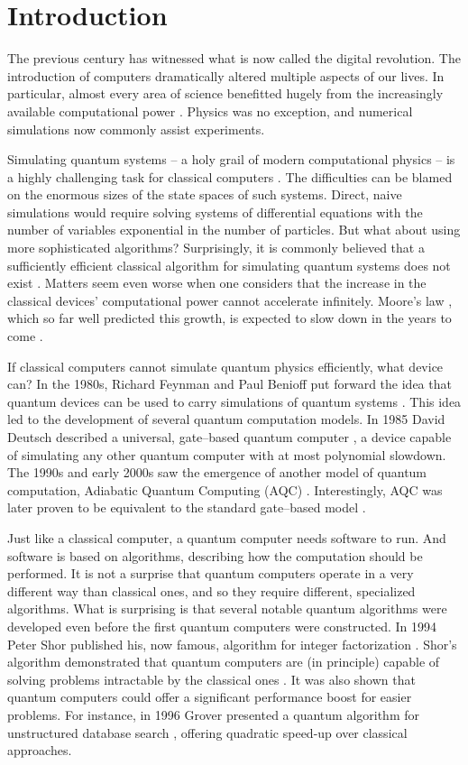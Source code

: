 \chapter*{Introduction}
The previous century has witnessed what is now called the digital revolution. The introduction of
computers dramatically altered multiple aspects of our lives. In particular, almost every area of
science benefitted hugely from the increasingly available computational power \cite{winsberg}.
Physics was no exception, and numerical simulations now commonly assist experiments.

Simulating quantum systems -- a holy grail of modern computational physics -- is a highly
challenging task for classical computers \cite{feynman.82}. The difficulties can be blamed on the
enormous sizes of the state spaces of such systems. Direct, naive simulations would require solving
systems of differential equations with the number of variables exponential in the number of
particles. But what about using more sophisticated algorithms? Surprisingly, it is commonly believed
that a sufficiently efficient classical algorithm for simulating quantum systems does not exist
\cite{feynman.82, poplavskii}. Matters seem even worse when one considers that the increase in the
classical devices' computational power cannot accelerate infinitely. Moore's law \cite{mack}, which
so far well predicted this growth, is expected to slow down in the years to come \cite{waldrop,
kumar}.

If classical computers cannot simulate quantum physics efficiently, what device can? In the 1980s,
Richard Feynman and Paul Benioff put forward the idea that quantum devices can be used to carry
simulations of quantum systems \cite{feynman.82,benioff.80}. This idea led to the development of
several quantum computation models. In 1985 David Deutsch described a universal, gate--based quantum
computer \cite{deutsch}, a device capable of simulating any other quantum computer with at most
polynomial slowdown. The 1990s and early 2000s saw the emergence of another model of quantum
computation, Adiabatic Quantum Computing (AQC) \cite{kadowaki,farhi}. Interestingly, AQC was later
proven to be equivalent to the standard gate--based model \cite{aharonov}.

Just like a classical computer, a quantum computer needs software to run. And software is based on
algorithms, describing how the computation should be performed. It is not a surprise that quantum
computers operate in a very different way than classical ones, and so they require different,
specialized algorithms. What is surprising is that several notable quantum algorithms were developed
even before the first quantum computers were constructed. In 1994 Peter Shor published his, now
famous, algorithm for integer factorization \cite{shor}. Shor's algorithm demonstrated that quantum
computers are (in principle) capable of solving problems intractable by the classical ones
\cite{kleinjung}. It was also shown that quantum computers could offer a significant performance
boost for easier problems. For instance, in 1996 Grover presented a quantum algorithm for
unstructured database search \cite{grover}, offering quadratic speed-up over classical approaches. 

